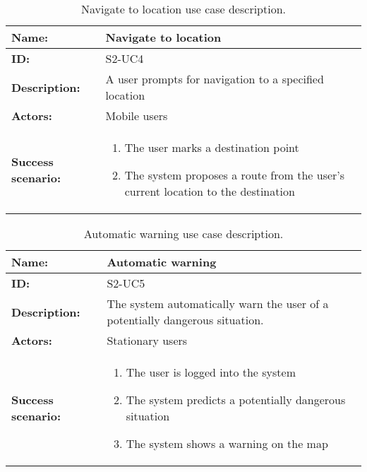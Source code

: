 \begin{table}[h!]
    \centering
    \begin{tabularx}{\textwidth}{|l|X|}
        \hline
        \textbf{Name:}  & Navigate to location \\ \hline
        \textbf{ID:}    & S2-UC4 \\ \hline
        \textbf{Description:} & A user prompts for navigation to a specified location \\ \hline
        \textbf{Actors:} & Mobile users \\ \hline
        \textbf{Success scenario:} & 
        \begin{enumerate}
            \item The user marks a destination point
            \item The system proposes a route from the user's current location to the destination
        \end{enumerate}
        \\ \hline
    \end{tabularx}
    \caption{Navigate to location use case description.}
    \label{tab:s2-uc4}
\end{table}

\begin{table}[h!]
    \centering
    \begin{tabularx}{\textwidth}{|l|X|}
        \hline
        \textbf{Name:}  & Automatic warning \\ \hline
        \textbf{ID:}    & S2-UC5 \\ \hline
        \textbf{Description:} & The system automatically warn the user of a potentially dangerous situation. \\ \hline
        \textbf{Actors:} & Stationary users \\ \hline
        \textbf{Success scenario:} & 
        \begin{enumerate}
            \item The user is logged into the system
            \item The system predicts a potentially dangerous situation
            \item The system shows a warning on the map
        \end{enumerate}
        \\ \hline
    \end{tabularx}
    \caption{Automatic warning use case description.}
    \label{tab:s2-uc5}
\end{table}

